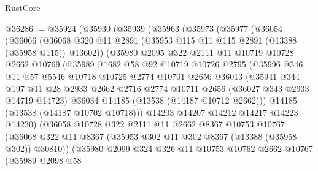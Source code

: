 \begin{lexlean}{RustCore}
\begin{coremodule}
@36286 := @35924
    (@35930
      (@35939
        (@35963
          (@35973
            (@35977
              (@36054
                (@36066
                  (@36068 @320 @11 @2891 (@35953 @115 @11 @115 @2891 (@13388 (@35958 @115)) @13602))
                  (@35980
                    @2095
                    @322
                    @2111
                    @11
                    @10719
                    @10728
                    @2662
                    @10769
                    (@35989
                      @1682
                      @58
                      @92
                      @10719
                      @10726
                      @2795
                      (@35996
                        @346
                        @11
                        @57
                        @5546
                        @10718
                        @10725
                        @2774
                        @10701
                        @2656
                        @36013
                        (@35941
                          @344
                          @197
                          @11
                          @28
                          @2933
                          @2662
                          @2716
                          @2774
                          @10711
                          @2656
                          (@36027 @343 @2933 @14719 @14723)
                          @36034
                          @14185
                          (@13538 (@14187 @10712 @2662)))
                        @14185
                        (@13538 (@14187 @10702 @10718)))
                      @14203
                      @14207
                      @14212
                      @14217
                      @14223
                      @14230)
                    (@36058
                      @10728
                      @322
                      @2111
                      @11
                      @2662
                      @8367
                      @10753
                      @10767
                      (@36068
                        @322
                        @11
                        @8367
                        (@35953 @302 @11 @302 @8367 (@13388 (@35958 @302)) @30810))
                      (@35980
                        @2099
                        @324
                        @326
                        @11
                        @10753
                        @10762
                        @2662
                        @10767
                        (@35989
                          @2098
                          @58

\end{coremodule}
\end{lexlean}
